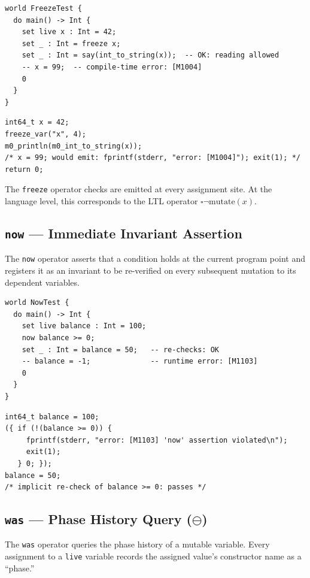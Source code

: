 \documentclass[11pt,a4paper]{article}
\begin{document}
\begin{lstlisting}[style=Mn,caption={freeze example.}]
world FreezeTest {
  do main() -> Int {
    set live x : Int = 42;
    set _ : Int = freeze x;
    set _ : Int = say(int_to_string(x));  -- OK: reading allowed
    -- x = 99;  -- compile-time error: [M1004]
    0
  }
}
\end{lstlisting}

\begin{lstlisting}[style=C,caption={Generated C for freeze.},numbers=none]
int64_t x = 42;
freeze_var("x", 4);
m0_println(m0_int_to_string(x));
/* x = 99; would emit: fprintf(stderr, "error: [M1004]"); exit(1); */
return 0;
\end{lstlisting}

The \texttt{freeze} operator checks are emitted at every assignment site. At the language level,
this corresponds to the LTL operator $\square\neg\mathrm{mutate}(x)$.

\subsection{\texttt{now} --- Immediate Invariant Assertion}
\label{sec:now}

The \texttt{now} operator asserts that a condition holds at the current program point and
registers it as an invariant to be re-verified on every subsequent mutation to its dependent
variables.

\begin{lstlisting}[style=Mn,caption={now example.}]
world NowTest {
  do main() -> Int {
    set live balance : Int = 100;
    now balance >= 0;
    set _ : Int = balance = 50;   -- re-checks: OK
    -- balance = -1;              -- runtime error: [M1103]
    0
  }
}
\end{lstlisting}

\begin{lstlisting}[style=C,caption={Generated C for now.},numbers=none]
int64_t balance = 100;
({ if (!(balance >= 0)) {
     fprintf(stderr, "error: [M1103] 'now' assertion violated\n");
     exit(1);
   } 0; });
balance = 50;
/* implicit re-check of balance >= 0: passes */
\end{lstlisting}

\subsection{\texttt{was} --- Phase History Query ($\ominus$)}
\label{sec:was}

The \texttt{was} operator queries the phase history of a mutable variable. Every assignment to a
\texttt{live} variable records the assigned value's constructor name as a ``phase.''
\end{document}

